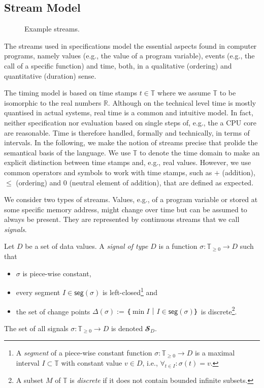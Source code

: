 \subsection{Stream Model}
\label{sec:streams}

\begin{figure}
  
  \caption{Example streams.\label{fig:streams}} 
\end{figure}

The streams used in \tessla specifications model the essential aspects found in computer programs, namely values (e.g., the value of a program variable), events (e.g., the call of a specific function) and time, both, in a qualitative (ordering) and quantitative (duration) sense.

The timing model is based on time stamps $t∈𝕋$ where we assume $𝕋$ to be isomorphic to the real numbers $ℝ$.
Although on the technical level time is mostly quantised in actual systems, real time is a common and intuitive model.
In fact, neither specification nor evaluation based on single steps of, e.g., the a CPU core are reasonable. 
Time is therefore handled, formally and technically, in terms of intervals.
In the following, we make the notion of streams precise that prolide the semantical basis of the language.
We use $𝕋$ to denote the time domain to make an explicit distinction between time stamps and, e.g., real values.
However, we use common operators and symbols to work with time stamps, such as $+$ (addition), $≤$ (ordering) and $0$ (neutral element of addition), that are defined as expected.

We consider two types of streams.
Values, e.g., of a program variable or stored at some specific memory address, might change over time but can be assumed to always be present.
They are represented by continuous streams that we call \emph{signals}. 

\begin{definition}[Signals]
  Let $D$ be a set of data values. 
  A \emph{signal of type $D$} is a function $σ: 𝕋_{≥0} → D$ such that
  \begin{itemize}
    \item $σ$ is piece-wise constant,
    \item every segment $I∈\mathsf{seg}(σ)$ is left-closed\footnote{
          A \emph{segment} of a piece-wise constant function $σ: 𝕋_{≥0} → D$ is a maximal interval $I⊂𝕋$ with constant value $v∈D$, i.e., $∀_{t∈I}:σ(t)=v$.} and
    \item the set of change points $Δ(σ) := ｛\min I｜I∈\mathsf{seg}(σ)｝$ is discrete\footnote{A subset $M$ of $𝕋$ is \emph{discrete} if it does not contain bounded infinite subsets.}.
  \end{itemize}
  The set of all signals $σ: 𝕋_{≥0} → D$ is denoted $𝓢_D$.
\end{definition}

